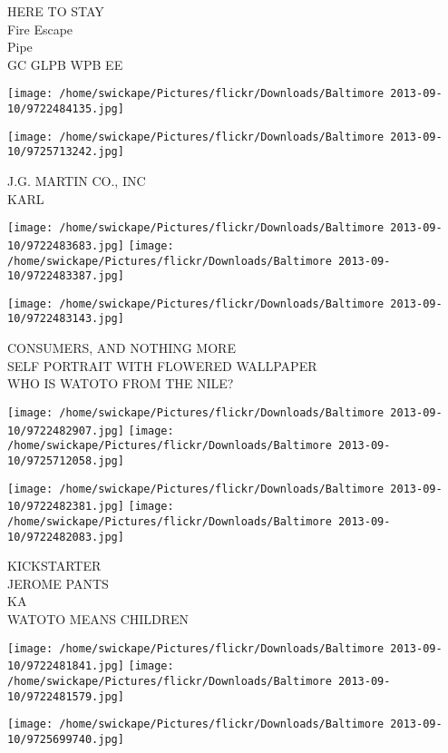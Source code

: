 \documentclass[10pt,letterpaper]{article}
\begin{document}
HERE TO STAY\\
Fire Escape\\
Pipe\\
GC GLPB WPB EE
\pagebreak

\texttt{[image: /home/swickape/Pictures/flickr/Downloads/Baltimore 2013-09-10/9722484135.jpg]}

\vspace{0.25in}
\texttt{[image: /home/swickape/Pictures/flickr/Downloads/Baltimore 2013-09-10/9725713242.jpg]}

J.G. MARTIN CO., INC\\
KARL
\pagebreak

\texttt{[image: /home/swickape/Pictures/flickr/Downloads/Baltimore 2013-09-10/9722483683.jpg]}
\texttt{[image: /home/swickape/Pictures/flickr/Downloads/Baltimore 2013-09-10/9722483387.jpg]}

\vspace{0.25in}
\texttt{[image: /home/swickape/Pictures/flickr/Downloads/Baltimore 2013-09-10/9722483143.jpg]}

CONSUMERS, AND NOTHING MORE\\
SELF PORTRAIT WITH FLOWERED WALLPAPER\\
WHO IS WATOTO FROM THE NILE?
\pagebreak

\texttt{[image: /home/swickape/Pictures/flickr/Downloads/Baltimore 2013-09-10/9722482907.jpg]}
\texttt{[image: /home/swickape/Pictures/flickr/Downloads/Baltimore 2013-09-10/9725712058.jpg]}

\texttt{[image: /home/swickape/Pictures/flickr/Downloads/Baltimore 2013-09-10/9722482381.jpg]}
\texttt{[image: /home/swickape/Pictures/flickr/Downloads/Baltimore 2013-09-10/9722482083.jpg]}

KICKSTARTER\\
JEROME PANTS\\
KA\\
WATOTO MEANS CHILDREN
\pagebreak

\texttt{[image: /home/swickape/Pictures/flickr/Downloads/Baltimore 2013-09-10/9722481841.jpg]}
\texttt{[image: /home/swickape/Pictures/flickr/Downloads/Baltimore 2013-09-10/9722481579.jpg]}

\vspace{0.25in}
\texttt{[image: /home/swickape/Pictures/flickr/Downloads/Baltimore 2013-09-10/9725699740.jpg]}
\end{document}
